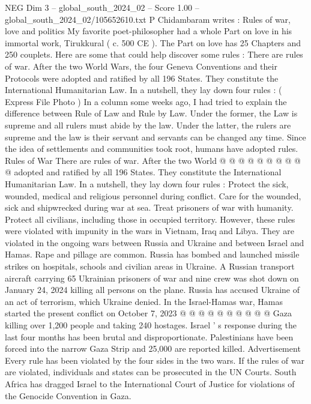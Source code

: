 \begin{textsample}{NEG Dim 3 – global\_south\_2024\_02 – Score 1.00 – global\_south\_2024\_02/105652610.txt}  \label{ex:f3_neg_100}
P Chidambaram writes : Rules of war, love and politics My favorite poet-philosopher had a whole Part on love in his immortal work, Tirukkural ( c. 500 CE ).
The Part on love has 25 Chapters and 250 couplets.
Here are some that could help discover some rules : There are rules of war.
After the two World Wars, the four Geneva Conventions and their Protocols were adopted and ratified by all 196 States.
They constitute the International Humanitarian Law.
In a nutshell, they lay down four rules : ( Express File Photo ) In a column some weeks ago, I had tried to explain the difference between Rule of Law and Rule by Law.
Under the former, the Law is supreme and all rulers must abide by the law.
Under the latter, the rulers are supreme and the law is their servant and servants can be changed any time.
Since the idea of settlements and communities took root, humans have adopted rules.
Rules of War There are rules of war.
After the two World @ @ @ @ @ @ @ @ @ @ adopted and ratified by all 196 States.
They constitute the International Humanitarian Law.
In a nutshell, they lay down four rules : Protect the sick, wounded, medical and religious personnel during conflict.
Care for the wounded, sick and shipwrecked during war at sea.
Treat prisoners of war with humanity.
Protect all civilians, including those in occupied territory.
However, these rules were violated with impunity in the wars in Vietnam, Iraq and Libya.
They are violated in the ongoing wars between Russia and Ukraine and between Israel and Hamas.
Rape and pillage are common.
Russia has bombed and launched missile strikes on hospitals, schools and civilian areas in Ukraine.
A Russian transport aircraft carrying 65 Ukrainian prisoners of war and nine crew was shot down on January 24, 2024 killing all persons on the plane.
Russia has accused Ukraine of an act of terrorism, which Ukraine denied.
In the Israel-Hamas war, Hamas started the present conflict on October 7, 2023 @ @ @ @ @ @ @ @ @ @ Gaza killing over 1,200 people and taking 240 hostages.
Israel ' s response during the last four months has been brutal and disproportionate.
Palestinians have been forced into the narrow Gaza Strip and 25,000 are reported killed.
Advertisement Every rule has been violated by the four sides in the two wars.
If the rules of war are violated, individuals and states can be prosecuted in the UN Courts.
South Africa has dragged Israel to the International Court of Justice for violations of the Genocide Convention in Gaza.

\end{textsample}
